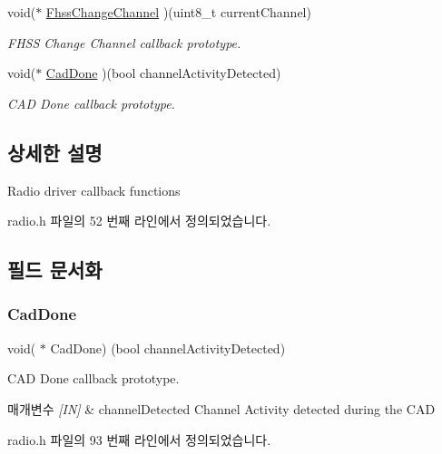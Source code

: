 \begin{DoxyCompactItemize}
void($\ast$ \mbox{\hyperlink{struct_radio_events__t_ac80306a77a53595fed3bca4a1a72ce54}{Fhss\+Change\+Channel}} )(uint8\+\_\+t current\+Channel)
\begin{DoxyCompactList}\small\item\em F\+H\+SS Change Channel callback prototype. \end{DoxyCompactList}\item 
void($\ast$ \mbox{\hyperlink{struct_radio_events__t_a554a1c53c1b150353f5711ab4e43b577}{Cad\+Done}} )(bool channel\+Activity\+Detected)
\begin{DoxyCompactList}\small\item\em C\+AD Done callback prototype. \end{DoxyCompactList}\end{DoxyCompactItemize}


\subsection{상세한 설명}
Radio driver callback functions 

radio.\+h 파일의 52 번째 라인에서 정의되었습니다.



\subsection{필드 문서화}
\mbox{\label{struct_radio_events__t_a554a1c53c1b150353f5711ab4e43b577}} 
\subsubsection{\texorpdfstring{Cad\+Done}{CadDone}}
{\footnotesize\ttfamily void( $\ast$ Cad\+Done) (bool channel\+Activity\+Detected)}



C\+AD Done callback prototype. 


\begin{DoxyParams}{매개변수}
{\em \mbox{[}\+I\+N\mbox{]}} & channel\+Detected Channel Activity detected during the C\+AD \\
\hline
\end{DoxyParams}


radio.\+h 파일의 93 번째 라인에서 정의되었습니다.

\mbox{\label{struct_radio_events__t_ac80306a77a53595fed3bca4a1a72ce54}} 
